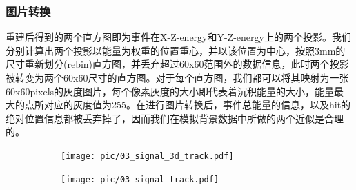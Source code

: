 \subsubsection{图片转换}
    重建后得到的两个直方图即为事件在X-Z-energy和Y-Z-energy上的两个投影。我们分别计算出两个投影以能量为权重的位置重心，并以该位置为中心，按照3mm的尺寸重新划分(rebin)直方图，并丢弃超过60x60范围外的数据信息，此时两个投影被转变为两个60x60尺寸的直方图。对于每个直方图，我们都可以将其映射为一张60x60pixels的灰度图片，每个像素灰度的大小即代表着沉积能量的大小，能量最大的点所对应的灰度值为255。在进行图片转换后，事件总能量的信息，以及hit的绝对位置信息都被丢弃掉了，因而我们在模拟背景数据中所做的两个近似是合理的。

    \begin{figure}
        \centering
        \begin{subfigure}[t]{0.22\textwidth}
          \centering
          \texttt{[image: pic/03\_signal\_3d\_track.pdf]}
          \caption{}
        \end{subfigure}
        \begin{subfigure}[t]{0.44\textwidth}
          \centering
          \texttt{[image: pic/03\_signal\_track.pdf]}
          \caption{}
        \end{subfigure}
        \begin{subfigure}[t]{0.16\textwidth}
          \centering
          \setlength{\fboxsep}{0pt}
          \caption{}
        \end{subfigure}
        

\end{figure}
